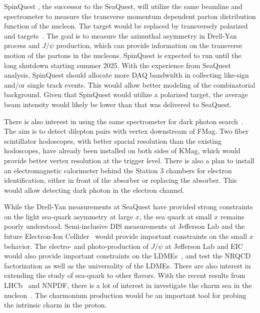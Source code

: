 \documentclass[../main.tex]{subfiles}
\begin{document}
SpinQuest \cite{geesaman2014}, the successor to the SeaQuest, will utilize the same beamline and
spectrometer to measure the transverse momentum dependent parton distribution
function of the nucleon. The target would be replaced by transversely polarized 
and  targets~\cite{crabb1995}. The goal is to measure the azimuthal asymmetry in
Drell-Yan process and $J/\psi$ production, which can provide information on the
transverse motion of the partons in the nucleons.
SpinQuest is expected to run until the long shutdown starting summer 2025. With the experience
from SeaQuest analysis, SpinQuest should allocate more DAQ bandwidth in collecting
like-sign and/or single track events. This would allow better modeling of the combinatorial
background. Given that SpinQuest would utilize a polarized target,
the average beam intensity would likely be lower than that was delivered to SeaQuest.

There is also interest in using the same spectrometer for dark photon search~\cite{apyan2022}.
The aim is to detect dilepton pairs with vertex downstream of FMag.
Two fiber scintillator hodoscopes, with better spacial resolution than the existing hodoscopes,
have already been installed on both sides of KMag,
which would provide better vertex resolution at the trigger level.
There is also a plan to install an electromagnetic calorimeter behind the
Station 3 chambers for electron identification, either in front of the absorber or replacing the absorber.
This would allow detecting dark photon in the electron channel.

While the Drell-Yan measurements at SeaQuest have provided strong constraints on the light sea-quark
asymmetry at large $x$, the sea quark at small $x$ remains poorly understood.
Semi-inclusive DIS measurements at Jefferson Lab and the future Electron-Ion Collider~\cite{abdulkhalek2022}
would provide important constraints on the small $x$ behavior. 
The electro- and photo-production of $J/\psi$ at Jefferson Lab and EIC would also provide important
constraints on the LDMEs~\cite{qiu2021}, and test the NRQCD factorization as well as the universality of the LDMEs. 
There are also interest in extending the study of sea-quark to other flavors. 
With the recent results from LHCb~\cite{aaij2022} and NNPDF\cite{ball2022},
there is a lot of interest in investigate the charm sea in the nucleon~\cite{vogt2021,vogt2023}.
The charmonium production would be an important tool for probing the intrinsic charm in the proton.

\ifSubfilesClassLoaded{ \printbibliography[heading=bibintoc,title={References}]}{}
\end{document}
